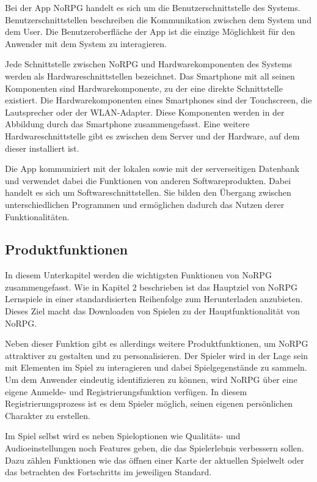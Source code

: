 		Bei der App NoRPG handelt es sich um die Benutzerschnittstelle des Systems. Benutzerschnittstellen beschreiben die Kommunikation zwischen dem System und dem User. Die Benutzeroberfläche der App ist die einzige Möglichkeit für den Anwender mit dem System zu interagieren.
		
		Jede Schnittstelle zwischen NoRPG und Hardwarekomponenten des Systems werden als Hardwareschnittstellen bezeichnet. Das Smartphone mit all seinen Komponenten sind Hardwarekomponente, zu der eine direkte  Schnittstelle existiert. Die Hardwarekomponenten eines Smartphones sind der Touchscreen, die Lautsprecher oder der WLAN-Adapter. Diese Komponenten werden in der Abbildung durch das Smartphone zusammengefasst. Eine weitere Hardwareschnittstelle gibt es zwischen dem Server und der Hardware, auf dem dieser installiert ist.
		
		Die App kommuniziert mit der lokalen sowie mit der serverseitigen Datenbank und verwendet dabei die Funktionen von anderen Softwareprodukten. Dabei handelt es sich um Softwareschnittstellen. Sie bilden den Übergang zwischen unterschiedlichen Programmen und ermöglichen dadurch das Nutzen derer Funktionalitäten. 

	\subsection{Produktfunktionen}
		In diesem Unterkapitel werden die wichtigsten Funktionen von NoRPG zusammengefasst. Wie in Kapitel 2 beschrieben ist das Hauptziel von NoRPG Lernspiele in einer standardisierten Reihenfolge zum Herunterladen anzubieten. Dieses Ziel macht das Downloaden von Spielen zu der Hauptfunktionalität von NoRPG. 
		
		Neben dieser Funktion gibt es allerdings weitere Produktfunktionen, um NoRPG attraktiver zu gestalten und zu personalisieren. Der Spieler wird in der Lage sein mit Elementen im Spiel zu interagieren und dabei Spielgegenstände zu sammeln. Um dem Anwender eindeutig identifizieren zu können, wird NoRPG über eine eigene Anmelde- und Registrierungsfunktion verfügen. In diesem Registrierungsprozess ist es dem Spieler möglich, seinen eigenen persönlichen Charakter zu erstellen.
		
		Im Spiel selbst wird es neben Spieloptionen wie Qualitäts- und Audioeinstellungen noch Features geben, die das Spielerlebnis verbessern sollen. Dazu zählen Funktionen wie das öffnen einer Karte der aktuellen Spielwelt oder das betrachten des Fortschritts im jeweiligen Standard.
		
